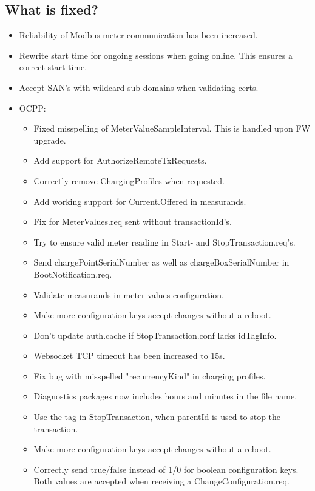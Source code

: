 \documentclass{scrartcl}
\begin{document}
\subsection*{What is fixed?}

\begin{itemize}
\item Reliability of Modbus meter communication has been increased.
\item Rewrite start time for ongoing sessions when going online. This ensures
  a correct start time.
\item Accept SAN's with wildcard sub-domains when validating certs.
\item OCPP:
  \begin{itemize}
  \item Fixed misspelling of MeterValueSampleInterval. This is handled upon FW
    upgrade.
  \item Add support for AuthorizeRemoteTxRequests.
  \item Correctly remove ChargingProfiles when requested.
  \item Add working support for Current.Offered in measurands.
  \item Fix for MeterValues.req sent without transactionId's.
  \item Try to ensure valid meter reading in Start- and
    StopTransaction.req's.
  \item Send chargePointSerialNumber as well as chargeBoxSerialNumber in
    BootNotification.req.
  \item Validate measurands in meter values configuration.
  \item Make more configuration keys accept changes without a reboot.
  \item Don't update auth.cache if StopTransaction.conf lacks idTagInfo.
  \item Websocket TCP timeout has been increased to 15s.
  \item Fix bug with misspelled "recurrencyKind" in charging profiles.
  \item Diagnostics packages now includes hours and minutes in the file name.
  \item Use the  tag in StopTransaction, when parentId is used to stop the transaction.
  \item Make more configuration keys accept changes without a reboot.
  \item Correctly send true/false instead of 1/0 for boolean configuration
    keys. Both values are accepted when receiving a ChangeConfiguration.req.

\end{itemize}
\end{itemize}
\end{document}
